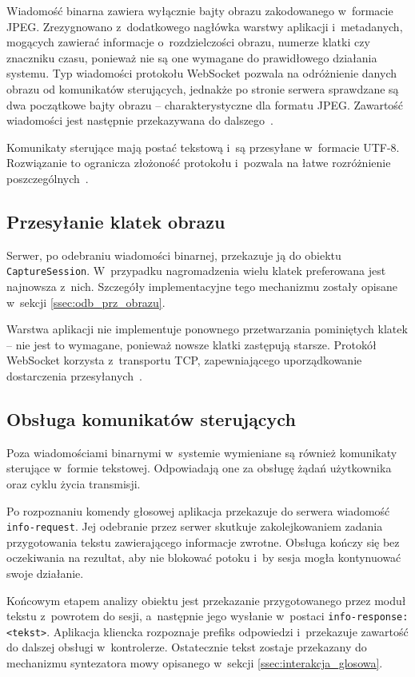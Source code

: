 Wiadomość binarna zawiera wyłącznie bajty obrazu zakodowanego w~formacie JPEG. Zrezygnowano z~dodatkowego nagłówka warstwy aplikacji i~metadanych, mogących zawierać informacje o~rozdzielczości obrazu, numerze klatki czy znaczniku czasu, ponieważ nie są one wymagane do prawidłowego działania systemu. Typ wiadomości protokołu WebSocket pozwala na odróżnienie danych obrazu od komunikatów sterujących, jednakże po stronie serwera sprawdzane są dwa początkowe bajty obrazu -- charakterystyczne dla formatu JPEG. Zawartość wiadomości jest następnie przekazywana do dalszego~.

Komunikaty sterujące mają postać tekstową i~są przesyłane w~formacie UTF-8. Rozwiązanie to ogranicza złożoność protokołu i~pozwala na łatwe rozróżnienie poszczególnych~.

\subsection{Przesyłanie klatek obrazu}


Serwer, po odebraniu wiadomości binarnej, przekazuje ją do obiektu \texttt{CaptureSession}. W~przypadku nagromadzenia wielu klatek preferowana jest najnowsza z~nich. Szczegóły implementacyjne tego mechanizmu zostały opisane w~sekcji \ref{ssec:odb_prz_obrazu}.

Warstwa aplikacji nie implementuje ponownego przetwarzania pominiętych klatek -- nie jest to wymagane, ponieważ nowsze klatki zastępują starsze. Protokół WebSocket korzysta z~transportu TCP, zapewniającego uporządkowanie dostarczenia przesyłanych~.

\subsection{Obsługa komunikatów sterujących}

Poza wiadomościami binarnymi w~systemie wymieniane są również komunikaty sterujące w~formie tekstowej. Odpowiadają one za obsługę żądań użytkownika oraz cyklu życia transmisji.

Po rozpoznaniu komendy głosowej aplikacja przekazuje do serwera wiadomość \texttt{info-request}. Jej odebranie przez serwer skutkuje zakolejkowaniem zadania przygotowania tekstu zawierającego informacje zwrotne. Obsługa kończy się bez oczekiwania na rezultat, aby nie blokować potoku i~by sesja mogła kontynuować swoje działanie.

Końcowym etapem analizy obiektu jest przekazanie przygotowanego przez moduł tekstu z~powrotem do sesji, a~następnie jego wysłanie w~postaci \texttt{info-response:<tekst>}. Aplikacja kliencka rozpoznaje prefiks odpowiedzi i~przekazuje zawartość do dalszej obsługi w~kontrolerze. Ostatecznie tekst zostaje przekazany do mechanizmu syntezatora mowy opisanego w~sekcji \ref{ssec:interakcja_glosowa}.

